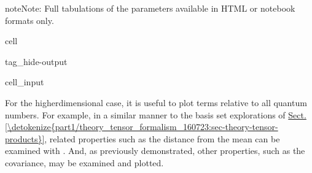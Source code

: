 \documentclass[letterpaper,table,10pt,english]{jupyterBook}
\begin{document}
\begin{sphinxShadowBox}
\sphinxstylesidebartitle{}

\begin{sphinxadmonition}{note}{Note:}
\sphinxAtStartPar
Full tabulations of the parameters available in HTML or notebook formats only.
\end{sphinxadmonition}
\end{sphinxShadowBox}

\begin{sphinxuseclass}{cell}
\begin{sphinxuseclass}{tag_hide-output}\begin{sphinxVerbatimInput}

\begin{sphinxuseclass}{cell_input}
\begin{sphinxVerbatim}[commandchars=\\\{\}]
    
                                                  

\PYG{p}{[}\PYG{p}{]}  
\end{sphinxVerbatim}

\end{sphinxuseclass}\end{sphinxVerbatimInput}

\end{sphinxuseclass}
\end{sphinxuseclass}
\sphinxAtStartPar
For the higher\sphinxhyphen{}dimensional case, it is useful to plot terms relative to all quantum numbers. For example, in a similar manner to the basis set explorations of \hyperref[\detokenize{part1/theory_tensor_formalism_160723:sec-theory-tensor-products}]{Sect.\@ \ref{\detokenize{part1/theory_tensor_formalism_160723:sec-theory-tensor-products}}}, related properties such as the distance from the mean can be examined with . And, as previously demonstrated, other properties, such as the covariance, may be examined and plotted.
\end{document}
